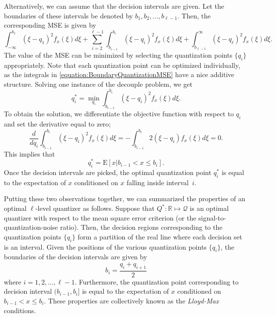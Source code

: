 Alternatively, we can assume that the decision intervals are given.
Let the boundaries of these intervals be denoted by $b_1, b_2, \ldots, b_{\ell-1}$.
Then, the corresponding MSE is given by
\begin{equation} \label{equation:BoundaryQuantizationMSE}
\int_{-\infty}^{b_1} (\xi - q_1)^2 f_x(\xi) d\xi
+ \sum_{i=2}^{{\ell}-1}
\int_{b_{i-1}}^{b_i} (\xi - q_i)^2 f_x(\xi) d\xi
+ \int_{b_{\ell-1}}^{\infty} (\xi - q_{\ell})^2 f_x(\xi) d\xi .
\end{equation}
The value of the MSE can be minimized by selecting the quantization points $\{ q_i \}$ appropriately.
Note that each quantization point can be optimized individually, as the integrals in \eqref{equation:BoundaryQuantizationMSE} have a nice additive structure.
Solving one instance of the decouple problem, we get
\begin{equation*}
q_i^* = \min_{q_i} \int_{b_{i-1}}^{b_i} (\xi - q_i)^2 f_x(\xi) d\xi .
\end{equation*}
To obtain the solution, we differentiate the objective function with respect to $q_i$ and set the derivative equal to zero;
\begin{equation*}
\frac{d}{d q_i} \int_{b_{i-1}}^{b_i} (\xi - q_i)^2 f_x(\xi) d\xi
= - \int_{b_{i-1}}^{b_i} 2 (\xi - q_i) f_x(\xi) d\xi = 0 .
\end{equation*}
This implies that
\begin{equation*}
q_i^* = \mathrm{E} [ x | b_{i-1} < x \leq b_i ] .
\end{equation*}
Once the decision intervals are picked, the optimal quantization point $q_i^*$ is equal to the expectation of $x$ conditioned on $x$ falling inside interval~$i$.

Putting these two observations together, we can summarized the properties of an optimal $\ell$-level quantizer as follows.
Suppose that $Q^* : \mathbb{R} \mapsto \mathcal{Q}$ is an optimal quantizer with respect to the mean square error criterion (or the signal-to-quantization-noise ratio).
Then, the decision regions corresponding to the quantization points $\{ q_i \}$ form a partition of the real line where each decision set is an interval.
Given the positions of the various quantization points $\{ q_i \}$, the boundaries of the decision intervals are given by
\begin{equation*}
b_i = \frac{q_i + q_{i+1}}{2}
\end{equation*}
where $i = 1, 2, \ldots, \ell-1$.
Furthermore, the quantization point corresponding to decision interval $(b_{i-1}, b_i]$ is equal to the expectation of $x$ conditioned on $b_{i-1} < x \leq b_i$.
These properties are collectively known as the \emph{Lloyd-Max} conditions.


